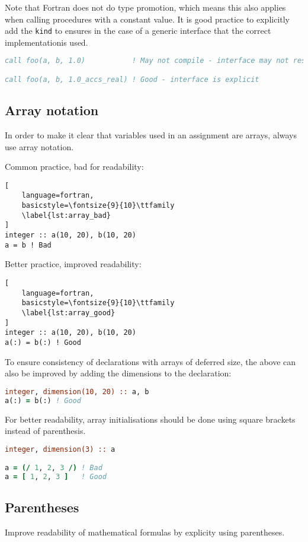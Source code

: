 \documentclass[11pt]{report}
\begin{document}
Note that Fortran does not do type promotion, which means this also applies when calling procedures with a
constant value. It is good practice to explicitly add the \texttt{kind} to ensures in the case of a generic 
interface that the correct implementationis used.
\begin{lstlisting}[language=fortran, basicstyle=\fontsize{9}{10}\ttfamily]
call foo(a, b, 1.0)           ! May not compile - interface may not resolve

call foo(a, b, 1.0_accs_real) ! Good - interface is explicit
\end{lstlisting}

\subsection{Array notation}
In order to make it clear that variables used in an assignment are arrays, always use array notation.

Common practice, bad for readability:
\begin{lstlisting}[
	language=fortran,
    basicstyle=\fontsize{9}{10}\ttfamily
    \label{lst:array_bad}
]
integer :: a(10, 20), b(10, 20)
a = b ! Bad
\end{lstlisting}

Better practice, improved readability:
\begin{lstlisting}[
	language=fortran,
    basicstyle=\fontsize{9}{10}\ttfamily
    \label{lst:array_good}
]
integer :: a(10, 20), b(10, 20)
a(:) = b(:) ! Good
\end{lstlisting}

To ensure consistency of declarations with arrays of deferred size, the above can also be improved
by adding the dimensions to the declaration:
\begin{lstlisting}[language=fortran,basicstyle=\fontsize{9}{10}\ttfamily\label{lst:array_good_decl}
]
integer, dimension(10, 20) :: a, b
a(:) = b(:) ! Good
\end{lstlisting}

For better readability, array initialisations should be done using square brackets instead of parenthesis.
\begin{lstlisting}[language=fortran,basicstyle=\fontsize{9}{10}\ttfamily\label{lst:array_good_decl}
]
integer, dimension(3) :: a

a = (/ 1, 2, 3 /) ! Bad
a = [ 1, 2, 3 ]   ! Good
\end{lstlisting}


\subsection{Parentheses}
Improve readability of mathematical formulas by explicity using parentheses.
\end{document}
